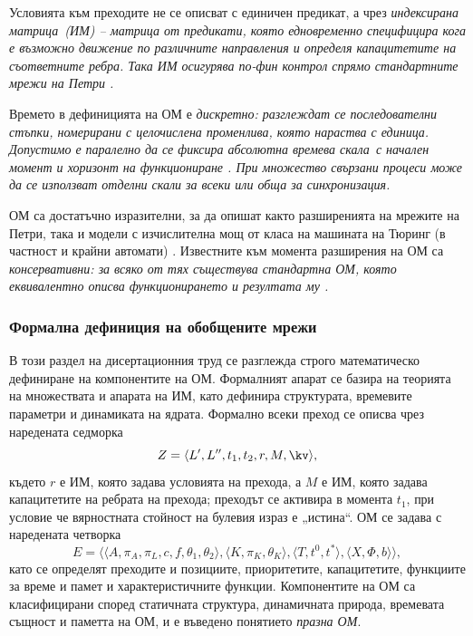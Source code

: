 Условията към преходите не се описват с единичен предикат, а чрез \it индексирана матрица\rm\ (ИМ) -- матрица от предикати, която едновременно специфицира кога е възможно движение по различните направления и определя капацитетите на съответните ребра. Така ИМ осигурява по-фин контрол спрямо стандартните мрежи на Петри \cite{DIS-Z1}.

Времето в дефиницията на ОМ е \it дискретно\rm: разглеждат се последователни стъпки, номерирани с целочислена променлива, която нараства с единица. Допустимо е паралелно да се фиксира \it абсолютна времева скала\rm\ с начален момент и хоризонт на функциониране \cite{DIS-Z1}. При множество свързани процеси може да се използват отделни скали за всеки или обща за синхронизация.

ОМ са достатъчно изразителни, за да опишат както разширенията на мрежите на Петри, така и модели с изчислителна мощ от класа на машината на Тюринг (в частност и крайни автомати) \cite{DIS-Z1}. Известните към момента разширения на ОМ са \it консервативни\rm: за всяко от тях съществува стандартна ОМ, която еквивалентно описва функционирането и резултата му \cite{DIS-Z1, DIS-BAM}.

\subsubsection{Формална дефиниция на обобщените мрежи}

\hspace*{2.5em}В този раздел на дисертационния труд се разглежда строго математическо дефиниране на компонентите на ОМ. Формалният апарат се базира на теорията на множествата и апарата на ИМ, като дефинира структурата, времевите параметри и динамиката на ядрата. Формално всеки преход се описва чрез наредената седморка
$$ Z = \langle L', L'', t_{1}, t_{2}, r, M, \kv \rangle, $$
където $r$ е ИМ, която задава условията на прехода, а $M$ е ИМ, която задава капацитетите на ребрата на прехода; преходът се активира в момента $t_1$, при условие че вярностната стойност на булевия израз е „истина“. ОМ се задава с наредената четворка
$$ E = \langle \langle A, \pi_{A}, \pi_{L}, c, f, \theta_{1}, \theta_{2} \rangle,
\langle K, \pi_{K}, \theta_{K} \rangle, \langle T, t^{0}, t^{*} \rangle,
\langle X, \Phi, b \rangle \rangle, $$
като се определят преходите и позициите, приоритетите, капацитетите, функциите за време и памет и характеристичните функции. Компонентите на ОМ са класифицирани според статичната структура, динамичната природа, времевата същност и паметта на ОМ, и е въведено понятието \textit{празна ОМ}.

